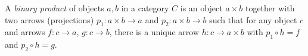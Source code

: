A \emph{binary product} of objects $a, b$ in a category $C$ is an object $a \times b$ together with two arrows (projections) $p_1: a \times b \to a$ and $p_2: a \times b \to b$ such that for any object $c$ and arrows $f: c \to a$, $g: c \to b$, there is a unique arrow $h: c \to a \times b$ with $p_1 \circ h = f$ and $p_2 \circ h = g$.
